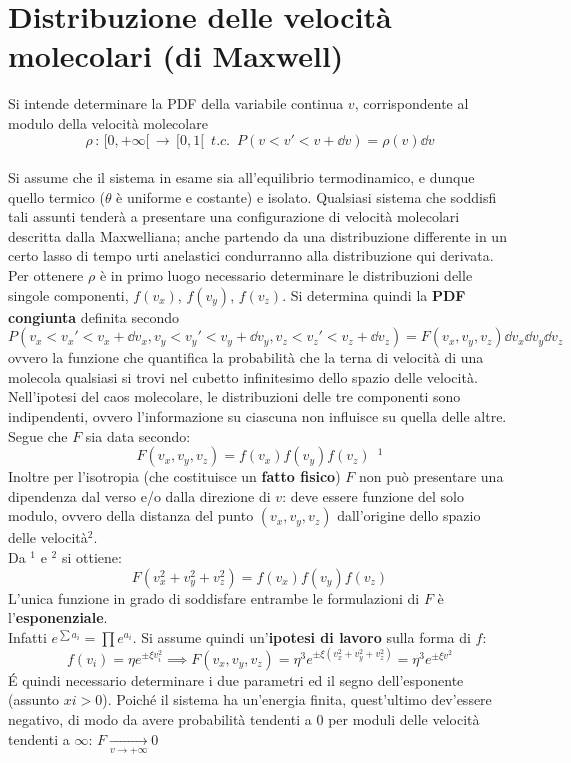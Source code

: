 \documentclass[10pt, oneside]{book}
\begin{document}
\section{Distribuzione delle velocità molecolari (di Maxwell)}
Si intende determinare la PDF della variabile continua $v$, corrispondente al modulo della velocità molecolare
\[\rho \, : \, [0, +\infty [ \, \rightarrow \, [0,1[ \enspace t.c. \enspace P(v < v' < v + \dd{v}) = \rho(v)\dd{v}\]
\\Si assume che il sistema in esame sia all'equilibrio termodinamico, e dunque quello termico ($\theta$ è uniforme e costante) e isolato. Qualsiasi sistema che soddisfi tali assunti tenderà a presentare una configurazione di velocità molecolari descritta dalla Maxwelliana; anche partendo da una distribuzione differente in un certo lasso di tempo urti anelastici condurranno alla distribuzione qui derivata.
\\Per ottenere $\rho$ è in primo luogo necessario determinare le distribuzioni delle singole componenti, $f(v_x)$, $f(v_y)$, $f(v_z)$. Si determina quindi la \textbf{PDF congiunta} definita secondo
\[P(v_x < v_x' < v_x + \dd{v_x}, v_y < v_y' < v_y + \dd{v_y}, v_z < v_z' < v_z + \dd{v_z}) = F(v_x, v_y, v_z) \dd{v_x} \dd{v_y} \dd{v_z}\]
ovvero la funzione che quantifica la probabilità che la terna di velocità di una molecola qualsiasi si trovi nel cubetto infinitesimo dello spazio delle velocità.
\\Nell'ipotesi del caos molecolare, le distribuzioni delle tre componenti sono indipendenti, ovvero l'informazione su ciascuna non influisce su quella delle altre. Segue che $F$ sia data secondo:
\[F(v_x, v_y, v_z) = f(v_x) f(v_y) f(v_z) \enspace ^1\]
Inoltre per l'isotropia (che costituisce un \textbf{fatto fisico}) $F$ non può presentare una dipendenza dal verso e/o dalla direzione di $v$: deve essere funzione del solo modulo, ovvero della distanza del punto $(v_x, v_y, v_z)$ dall'origine dello spazio delle velocità$^2$.
\\Da $^1$ e $^2$ si ottiene:
\[F(v_x^2 + v_y^2 + v_z^2) = f(v_x) f(v_y) f(v_z)\]
L'unica funzione in grado di soddisfare entrambe le formulazioni di $F$ è l'\textbf{esponenziale}. \\Infatti $e^{\sum a_i} = \prod e^{a_i}$. Si assume quindi un'\textbf{ipotesi di lavoro} sulla forma di $f$:
\[f(v_i) = \eta e^{\pm \xi v_i^2} \implies
 F(v_x, v_y, v_z) = \eta^3 e^{\pm \xi (v_x^2 + v_y^2 + v_z^2)} = \eta^3 e^{\pm \xi v^2}\]
\'E quindi necessario determinare i due parametri ed il segno dell'esponente (assunto $xi > 0$). Poiché il sistema ha un'energia finita, quest'ultimo dev'essere negativo, di modo da avere probabilità tendenti a $0$ per moduli delle velocità tendenti a $\infty$: $\displaystyle F \xrightarrow[v \rightarrow +\infty]{} 0$
\end{document}
